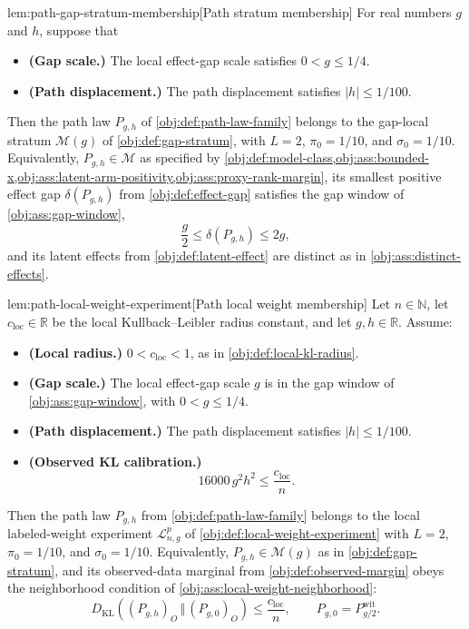 \begin{lemmav}{lem:path-gap-stratum-membership}[Path stratum membership]
For real numbers \(g\) and \(h\), suppose that
\begin{itemize}
\item \textbf{(Gap scale.)} The local effect-gap scale satisfies \(0<g\le 1/4\).
\item \textbf{(Path displacement.)} The path displacement satisfies \(|h|\le 1/100\).
\end{itemize}
Then the path law \(P_{g,h}\) of \cref{obj:def:path-law-family} belongs to the gap-local stratum \(\mathcal M(g)\) of \cref{obj:def:gap-stratum}, with \(L=2\), \(\pi_0=1/10\), and \(\sigma_0=1/10\). Equivalently, \(P_{g,h}\in\mathcal M\) as specified by \cref{obj:def:model-class,obj:ass:bounded-x,obj:ass:latent-arm-positivity,obj:ass:proxy-rank-margin}, its smallest positive effect gap \(\delta(P_{g,h})\) from \cref{obj:def:effect-gap} satisfies the gap window of \cref{obj:ass:gap-window},
\[
\frac{g}{2}\le \delta(P_{g,h})\le 2g,
\]
and its latent effects from \cref{obj:def:latent-effect} are distinct as in \cref{obj:ass:distinct-effects}.
\end{lemmav}

\begin{lemmav}{lem:path-local-weight-experiment}[Path local weight membership]
Let \(n\in\mathbb N\), let \(c_{\mathrm{loc}}\in\mathbb R\) be the local Kullback--Leibler radius constant, and let \(g,h\in\mathbb R\). Assume:
\begin{itemize}
\item \textbf{(Local radius.)} \(0<c_{\mathrm{loc}}<1\), as in \cref{obj:def:local-kl-radius}.
\item \textbf{(Gap scale.)} The local effect-gap scale \(g\) is in the gap window of \cref{obj:ass:gap-window}, with \(0<g\le 1/4\).
\item \textbf{(Path displacement.)} The path displacement satisfies \(|h|\le 1/100\).
\item \textbf{(Observed KL calibration.)}
\[
16000\,g^2h^2\le \frac{c_{\mathrm{loc}}}{n}.
\]
\end{itemize}
Then the path law \(P_{g,h}\) from \cref{obj:def:path-law-family} belongs to the local labeled-weight experiment \(\mathcal L_{n,g}^p\) of \cref{obj:def:local-weight-experiment} with \(L=2\), \(\pi_0=1/10\), and \(\sigma_0=1/10\). Equivalently, \(P_{g,h}\in\mathcal M(g)\) as in \cref{obj:def:gap-stratum}, and its observed-data marginal from \cref{obj:def:observed-margin} obeys the neighborhood condition of \cref{obj:ass:local-weight-neighborhood}:
\[
D_{\mathrm{KL}}\!\left((P_{g,h})_O\,\Vert\,(P_{g,0})_O\right)
\le \frac{c_{\mathrm{loc}}}{n},
\qquad
P_{g,0}=P^{\mathrm{wit}}_{g/2}.
\]
\end{lemmav}

